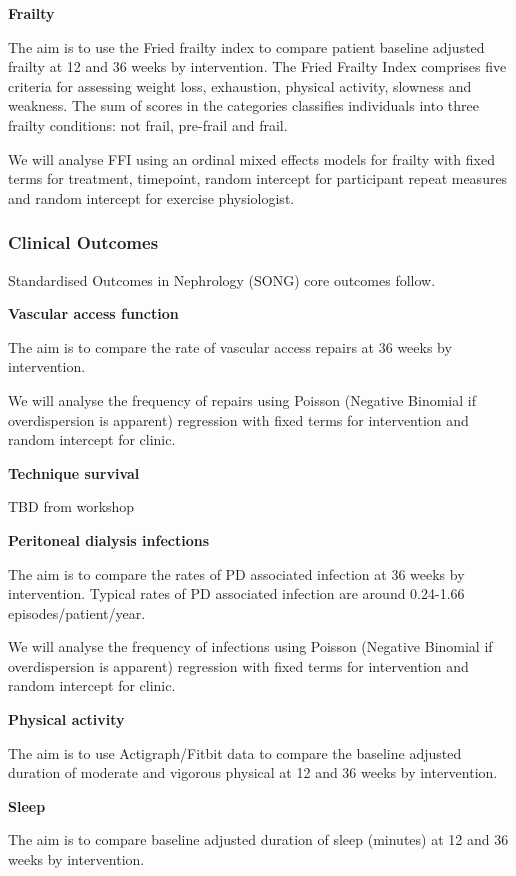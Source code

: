 \documentclass[11pt,parskip=half-]{scrartcl}
\begin{document}
\textbf{Frailty}

The aim is to use the Fried frailty index to compare patient baseline adjusted frailty at 12 and 36 weeks by intervention. The Fried Frailty Index comprises five criteria for assessing weight loss, exhaustion, physical activity, slowness and weakness. The sum of scores in the categories classifies individuals into three frailty conditions: not frail, pre-frail and frail.

We will analyse FFI using an ordinal mixed effects models for frailty with fixed terms for treatment, timepoint, random intercept for participant repeat measures and random intercept for exercise physiologist.


\subsubsection{Clinical Outcomes}\label{clinical-outcomes}

Standardised Outcomes in Nephrology (SONG) core outcomes follow.

\textbf{Vascular access function}

The aim is to compare the rate of vascular access repairs at 36 weeks by intervention.

We will analyse the frequency of repairs using Poisson (Negative Binomial if overdispersion is apparent) regression with fixed terms for intervention and random intercept for clinic.

\textbf{Technique survival}

TBD from workshop

\textbf{Peritoneal dialysis infections}

The aim is to compare the rates of PD associated infection at 36 weeks by intervention. Typical rates of PD associated infection are around 0.24-1.66 episodes/patient/year.

We will analyse the frequency of infections using Poisson (Negative Binomial if overdispersion is apparent) regression with fixed terms for intervention and random intercept for clinic.

\textbf{Physical activity}

The aim is to use Actigraph/Fitbit data to compare the baseline adjusted duration of moderate and vigorous physical at 12 and 36 weeks by intervention.

\textbf{Sleep}

The aim is to compare baseline adjusted duration of sleep (minutes) at 12 and 36 weeks by intervention.
\end{document}
